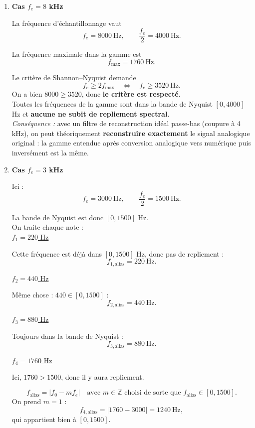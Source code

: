 \begin{enumerate}[label=(\alph*)]

\item \textbf{Cas $f_e = 8$ kHz}

La fréquence d'échantillonnage vaut
\[
f_e = 8000\ \text{Hz}, \qquad \frac{f_e}{2} = 4000\ \text{Hz}.
\]

La fréquence maximale dans la gamme est
\[
f_{\max} = 1760\ \text{Hz}.
\]

Le critère de Shannon–Nyquist demande
\[
f_e \ge 2 f_{\max} \quad \Longleftrightarrow \quad f_e \ge 3520\ \text{Hz}.
\]
On a bien $8000 \ge 3520$, donc \textbf{le critère est respecté}.  \\

Toutes les fréquences de la gamme sont dans la bande de Nyquist $[0, 4000]$ Hz
et \textbf{aucune ne subit de repliement spectral}. \\

\textit{Conséquence :} avec un filtre de reconstruction idéal passe-bas (coupure à 4 kHz), on peut théoriquement \textbf{reconstruire exactement} le signal analogique original : la gamme entendue après conversion analogique vers numérique puis inversément est la même. \\

\item \textbf{Cas $f_e = 3$ kHz}

Ici :
\[
f_e = 3000\ \text{Hz}, \qquad \frac{f_e}{2} = 1500\ \text{Hz}.
\]

La bande de Nyquist est donc $[0, 1500]$ Hz. \\

On traite chaque note : \\
\underline{$f_1 = 220$ Hz}

Cette fréquence est déjà dans $[0,1500]$ Hz, donc pas de repliement :
\[
f_{1,\text{alias}} = 220\ \text{Hz}.
\]

\underline{$f_2 = 440$ Hz}

Même chose : $440 \in [0,1500]$ :
\[
f_{2,\text{alias}} = 440\ \text{Hz}.
\]

\underline{$f_3 = 880$ Hz}

Toujours dans la bande de Nyquist :
\[
f_{3,\text{alias}} = 880\ \text{Hz}.
\]

\underline{$f_4 = 1760$ Hz}

Ici, $1760 > 1500$, donc il y aura repliement. 

\[
f_{\text{alias}} = \big| f_0 - m f_e \big|
\quad \text{avec } m \in \mathbb{Z} \text{ choisi de sorte que } f_{\text{alias}} \in [0, 1500].
\]
On prend $m = 1$ :
\[
f_{4,\text{alias}} = |1760 - 3000| = 1240\ \text{Hz},
\]
qui appartient bien à $[0, 1500]$.


\end{enumerate}
